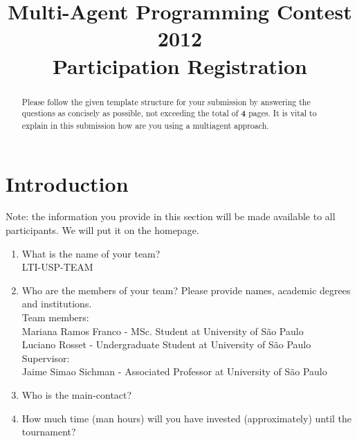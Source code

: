 \documentclass{llncs}
\begin{document}
\title{Multi-Agent Programming Contest 2012\\Participation Registration}
\author{}
\institute{}
\maketitle

\begin{abstract}
  Please follow the given template structure for your submission by
  answering the questions as concisely as possible, not exceeding the
  total of \textbf{4} pages. It is vital to explain in this submission
  how are you using a multiagent approach.


\end{abstract}


\section*{Introduction}

Note: the information you provide in this section will be made available
to all participants. We will put it on the homepage.

\begin{enumerate}
\item What is the name of your team? \\
LTI-USP-TEAM
\item Who are the members of your team? Please provide names, academic
  degrees and institutions.\\

Team members:\\
Mariana Ramos Franco - MSc. Student at University of São Paulo \\
Luciano Rosset - Undergraduate Student at University of São Paulo \\

Supervisor:\\
Jaime Simao Sichman - Associated Professor at University of São Paulo\\

\item Who is the main-contact?
\item How much time (man hours) will you have invested (approximately)
  until the tournament?
\end{enumerate}
\end{document}
